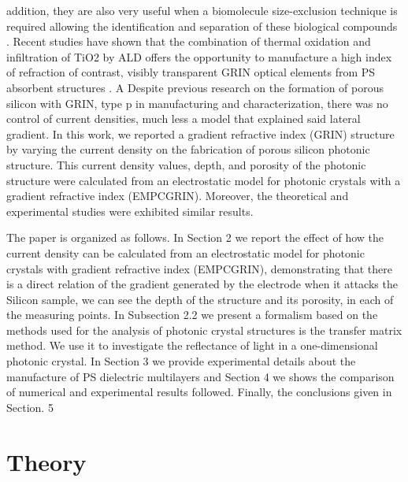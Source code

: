 \documentclass{article}
\begin{document}
addition, they are also very useful when a biomolecule size-exclusion
technique is required allowing the identification and separation of
these biological compounds \cite{I15}. Recent studies  have shown that
the  combination  of thermal  oxidation  and infiltration of TiO2   by
ALD offers the  opportunity to manufacture  a high index of refraction
of contrast, visibly transparent GRIN optical elements from PS
absorbent structures \cite{I16}. A Despite previous research on the
formation of porous silicon with GRIN, type p in manufacturing and
characterization, there was no control of current densities, much less
a model that  explained said lateral  gradient. In this work, we
reported a gradient refractive index (GRIN) structure by varying the
current density on the fabrication of porous silicon photonic
structure. This current density values, depth, and porosity of the
photonic structure were calculated from an electrostatic model for
photonic crystals with a gradient refractive index
(EMPCGRIN). Moreover, the theoretical and experimental studies were
exhibited similar results.

The paper is organized as follows. In Section 2  we report the effect
of how the current density can be calculated from an electrostatic
model for photonic crystals with gradient refractive index (EMPCGRIN),
demonstrating that there is a direct relation of the gradient
generated by the electrode when it attacks the Silicon sample, we can
see the depth of the structure and its porosity, in each of the
measuring points. In Subsection 2.2 we present a formalism based on
the methods used for the analysis of photonic crystal structures is
the transfer matrix method. We use it to investigate the reflectance
of light in a one-dimensional photonic crystal. In Section 3 we
provide experimental  details about the manufacture of PS dielectric
multilayers and Section 4 we shows the comparison of numerical and
experimental results followed. Finally,  the conclusions given in
Section. 5

\section{Theory}
\end{document}
